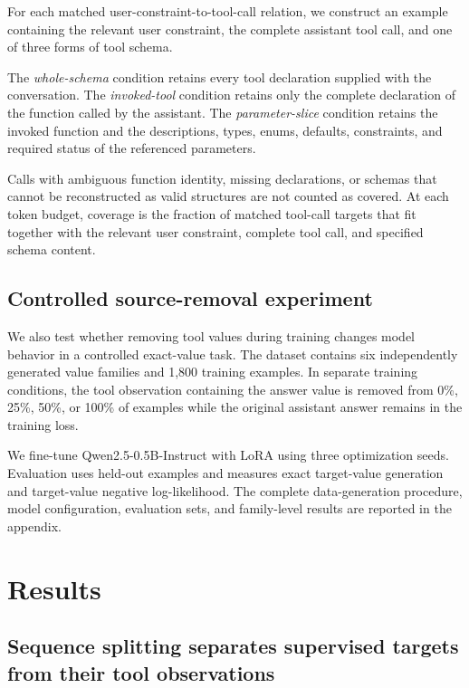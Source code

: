 \documentclass[pdflatex,sn-basic,Numbered]{sn-jnl}
\begin{document}
For each matched user-constraint-to-tool-call relation, we construct an example containing the relevant user constraint, the complete assistant tool call, and one of three forms of tool schema.

The \emph{whole-schema} condition retains every tool declaration supplied with the conversation. The \emph{invoked-tool} condition retains only the complete declaration of the function called by the assistant. The \emph{parameter-slice} condition retains the invoked function and the descriptions, types, enums, defaults, constraints, and required status of the referenced parameters.

Calls with ambiguous function identity, missing declarations, or schemas that cannot be reconstructed as valid structures are not counted as covered. At each token budget, coverage is the fraction of matched tool-call targets that fit together with the relevant user constraint, complete tool call, and specified schema content.


\subsection{Controlled source-removal experiment}
\label{sec:controlled}

We also test whether removing tool values during training changes model behavior in a controlled exact-value task. The dataset contains six independently generated value families and 1,800 training examples. In separate training conditions, the tool observation containing the answer value is removed from 0\%, 25\%, 50\%, or 100\% of examples while the original assistant answer remains in the training loss.

We fine-tune Qwen2.5-0.5B-Instruct with LoRA \citep{yang2024qwen25,hu2022lora} using three optimization seeds. Evaluation uses held-out examples and measures exact target-value generation and target-value negative log-likelihood. The complete data-generation procedure, model configuration, evaluation sets, and family-level results are reported in the appendix.

\section{Results}

\subsection{Sequence splitting separates supervised targets from their tool observations}
\label{sec:source_loss_results}
\end{document}
